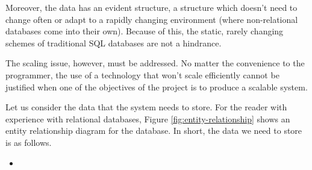 Moreover, the data has an evident structure, a structure which doesn't need to change often or adapt to a rapidly changing environment (where non-relational databases come into their own). Because of this, the static, rarely changing schemes of traditional SQL databases are not a hindrance. 

The scaling issue, however, must be addressed. No matter the convenience to the programmer, the use of a technology that won't scale efficiently cannot be justified when one of the objectives of the project is to produce a scalable system. 

Let us consider the data that the system needs to store. For the reader with experience with relational databases, Figure \ref{fig:entity-relationship} shows an entity relationship diagram for the database. In short, the data we need to store is as follows.

\begin{itemize}
\item
\end{itemize}



